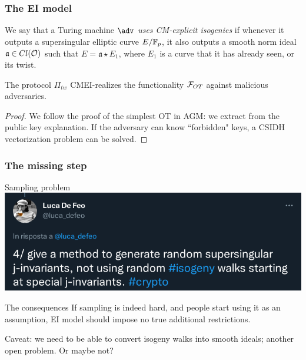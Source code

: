 \documentclass{beamer}
\begin{document}
    \begin{frame}
        \frametitle{The EI model}
        
        \begin{definition}
            We say that a Turing machine $\adv$ \emph{uses CM-explicit isogenies} if whenever it outputs a supersingular elliptic curve $E/\mathbb{F}_p$, it also outputs a smooth norm ideal $\mathfrak a\in Cl(\mathcal{O})$ such that $E=\mathfrak a\star E_1$, where $E_1$ is a curve that it has already seen, or its twist.
        \end{definition}
    
    
        \pause
        \begin{theorem}
            The protocol $\Pi_{tw}$ CMEI-realizes the functionality $\mathcal{F}_{OT}$ against malicious adversaries.
        \end{theorem}
    
        \begin{proof}
            We follow the proof of the simplest OT in AGM: we extract from the public key explanation. If the adversary can know ``forbidden" keys, a CSIDH vectorization problem can be solved. 
        \end{proof}
    \end{frame}

    \begin{frame}
        \frametitle{The missing step}
        
        \begin{block}{Sampling problem}
            \includegraphics[width=\linewidth]{images/DeFeo_twitter}
        \end{block}
    
        \begin{block}{The consequences}
            If sampling is indeed hard, and people start using it as an assumption, EI model should impose no true additional restrictions.
            
            Caveat: we need to be able to convert isogeny walks into smooth ideals; another open problem. Or maybe not?
        \end{block}
   
    \end{frame}
\end{document}
